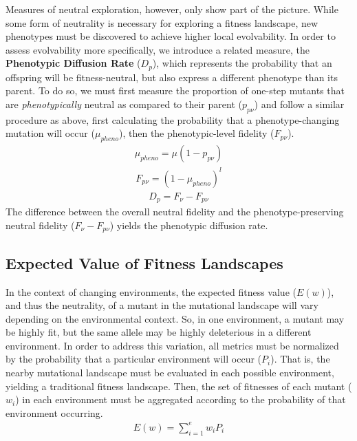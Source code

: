 \documentclass[PhD]{msu-thesis}
\begin{document}
Measures of neutral exploration, however, only show part of the picture. While some form of neutrality is necessary for exploring a fitness landscape, new phenotypes must be discovered to achieve higher local evolvability. In order to assess evolvability more specifically, we introduce a related measure, the \textbf{Phenotypic Diffusion Rate} ($D_p$), which represents the probability that an offspring will be fitness-neutral, but also express a different phenotype than its parent. To do so, we must first measure the proportion of one-step mutants that are \textit{phenotypically} neutral as compared to their parent ($p_{p\nu}$) and follow a similar procedure as above, first calculating the probability that a phenotype-changing mutation will occur ($\mu_{pheno}$), then the phenotypic-level fidelity ($F_{p\nu}$).
\begin{eqnarray}
\label{eq:phenotypic_mutation_rate}
	\mu_{pheno} = \mu (1- p_{p\nu})
\end{eqnarray}
\begin{eqnarray}
\label{eq:phenotypic_fidelity}
	F_{p\nu} = (1 - \mu_{pheno})^l
\end{eqnarray}
\begin{eqnarray}
\label{eq:phenotypic_diffusion_rate}
	D_p = F_\nu - F_{p\nu}
\end{eqnarray}
The difference between the overall neutral fidelity and the phenotype-preserving neutral fidelity ($F_\nu - F_{p\nu}$) yields the phenotypic diffusion rate.

\subsection{Expected Value of Fitness Landscapes}
In the context of changing environments, the expected fitness value ($E(w)$), and thus the neutrality, of a mutant in the mutational landscape will vary depending on the environmental context. So, in one environment, a mutant may be highly fit, but the same allele may be highly deleterious in a different environment. In order to address this variation, all metrics must be normalized by the probability that a particular environment will occur ($P_i$). That is, the nearby mutational landscape must be evaluated in each possible environment, yielding a traditional fitness landscape. Then, the set of fitnesses of each mutant ($w_i$) in each environment must be aggregated according to the probability of that environment occurring.
\begin{eqnarray}
\label{eq:expected_fitness_value}
	E(w) = \displaystyle\sum_{i=1}^{e} w_i P_i
\end{eqnarray}
\end{document}

